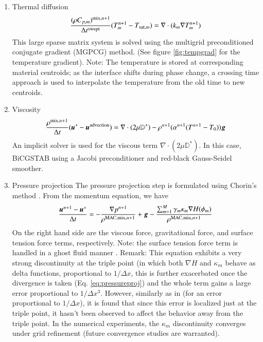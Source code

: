 \documentclass[preprint,12pt]{Definitions/elsarticle}
\newcommand{\tn}{\textnormal}
\newcommand{\bmg}{\mbox{\boldmath $g$\unboldmath}}
\newcommand{\bmu}{\mbox{\boldmath $u$\unboldmath}}
\newcommand{\DefTen}{\mathbb{D}}
\begin{document}
\begin{enumerate}
	
	\item Thermal diffusion
	\begin{equation}
	\frac{(\rho C_{p,m})^{\tn{mix},n+1}}{\Delta t^{\tn{swept}}}
	(T^{n+1}_{m}-T_{\tn{sat},m})=
	\nabla\cdot (k_{m} \nabla T^{n+1}_{m})
	\label{diffusion1}
	\end{equation}
	This large sparse matrix system is solved using the multigrid preconditioned conjugate gradient (MGPCG) method. (See figure \ref{fig:tempgrad} for the temperature gradient). Note: The temperature is stored at corresponding material centroids; as the interface shifts during phase change, a crossing time approach is used to interpolate the temperature from the old time to new centroids.\cite{liu2022novel,VAHAB2021}
	\item Viscosity
	\begin{equation}
	\frac{\rho^{\tn{mix},n+1}}{\Delta t}
	(\bmu^{\ast}-\bmu^{\tn{advection}})=
	\nabla\cdot(2\mu\DefTen^{\ast})-
	\rho^{n+1}(\alpha^{n+1}(T^{n+1}-T_{0}))\bmg
	\label{diffusion3}
	\end{equation}
	An implicit solver is used for the viscous term $\nabla\cdot(2\mu\DefTen^{\ast})$. In this case, BiCGSTAB using a Jacobi preconditioner and red-black Gauss-Seidel smoother.
	\item Pressure projection
	The pressure projection step is formulated using Chorin's method \cite{chorin1968numerical}. From the momentum equation, we have
	\begin{equation}
	\frac{\bmu^{n+1}-\bmu^{\ast}}{\Delta t}=
	-\frac{\nabla p^{n+1}}{\rho^{\tn{MAC,mix},n+1}}+\bmg-
	\frac{\sum_{m=1}^{M} \gamma_{m}\kappa_{m}\nabla H(\phi_{m})}
	{\rho^{\tn{MAC,mix},n+1}}
	\label{pressuregrad}
	\end{equation}
	On the right hand side are the viscous force, gravitational force, and surface tension force terms, respectively. Note: the surface tension force term is handled in a ghost fluid manner \cite{fedkiw1999GFM,sussman2007sharp}. Remark: This equation exhibits a very strong discontinuity at the triple point (in which both $\nabla H$ and $\kappa_m$ behave as delta functions, proportional to $1/\Delta x$, this is further exacerbated once the divergence is taken (Eq. \ref{eq:pressureproj}) and the whole term gains a large error proportional to $1/\Delta x^3$. However, similarly as in \cite{BukacETAL2023diffuse} (for an error proportional to $1/\Delta x$), it is found that since this error is localized just at the triple point, it hasn't been observed to affect the behavior away from the triple point. In the numerical experiments, the $\kappa_m$ discontinuity converges under grid refinement (future convergence studies are warranted).  \\
	

\end{enumerate}
\end{document}
